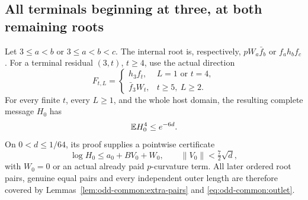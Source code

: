 \subsection{All terminals beginning at three, at both remaining roots}
\label{sec:odd-three:roots}

\begin{theorem}\label{thm:odd-three:roots}
Let $3\le a<b$ or $3\le a<b<c$. The internal root is, respectively,
$pW_a\bar f_b$ or $f_a h_bf_c$. For a terminal residual $(3,t)$,
$t\ge4$, use the actual direction
\[
 F_{t,L}=\begin{cases}
 h_3f_t,&L=1\text{ or }t=4,\\
 \bar f_3W_t,&t\ge5,\ L\ge2.
 \end{cases}
\]
For every finite $t$, every $L\ge1$, and the whole host domain,
the resulting complete message $H_0$ has
\begin{equation}\label{eq:odd-three:fourth}
 \mathbb E H_0^4\le e^{-6d}.
\end{equation}
On $0<d\le1/64$, its proof supplies a pointwise certificate
\begin{equation}\label{eq:odd-three:vector}
 \log H_0\le a_0+BV_0+W_0,\qquad
 \|V_0\|<\tfrac72\sqrt d,
\end{equation}
with $W_0=0$ or an actual already paid $p$-curvature term.
All later ordered root pairs, genuine equal pairs and every independent
outer length are therefore covered by
Lemmas~\ref{lem:odd-common:extra-pairs} and
\eqref{eq:odd-common:outlet}.
\end{theorem}
